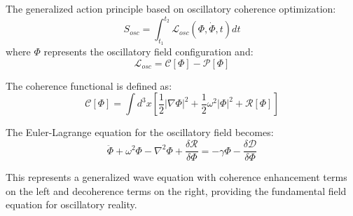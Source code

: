\documentclass[11pt,a4paper]{article}
\begin{document}
The generalized action principle based on oscillatory coherence optimization:
$$S_{osc} = \int_{t_1}^{t_2} \mathcal{L}_{osc}(\Phi, \dot{\Phi}, t) dt$$
where $\Phi$ represents the oscillatory field configuration and:
$$\mathcal{L}_{osc} = \mathcal{C}[\Phi] - \mathcal{P}[\Phi]$$

The coherence functional is defined as:
$$\mathcal{C}[\Phi] = \int d^3x \left[\frac{1}{2}|\nabla\Phi|^2 + \frac{1}{2}\omega^2|\Phi|^2 + \mathcal{R}[\Phi]\right]$$

The Euler-Lagrange equation for the oscillatory field becomes:
$$\ddot{\Phi} + \omega^2\Phi - \nabla^2\Phi + \frac{\delta \mathcal{R}}{\delta \Phi} = -\gamma\Phi - \frac{\delta \mathcal{D}}{\delta \Phi}$$

This represents a generalized wave equation with coherence enhancement terms on the left and decoherence terms on the right, providing the fundamental field equation for oscillatory reality.
\end{document}
